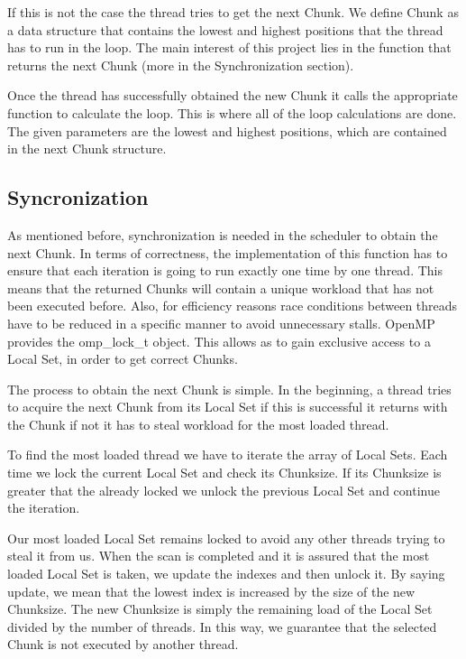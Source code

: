 \documentclass[12pt,a4paper]{article}
\begin{document}
If this is not the case the thread tries to get the next Chunk. We define Chunk as a data structure that contains the lowest and highest positions that the thread has to run in the loop. The main interest of this project lies in the function that returns the next Chunk (more in the Synchronization section).

Once the thread has successfully obtained the new Chunk it calls the appropriate function to calculate the loop. This is where all of the loop calculations are done. The given parameters are the lowest and highest positions, which are contained in the next Chunk structure.

\subsection{Syncronization}
As mentioned before, synchronization is needed in the scheduler to obtain the next Chunk. In terms of correctness, the implementation of this function has to ensure that each iteration is going to run exactly one time by one thread. This means that the returned Chunks will contain a unique workload that has not been executed before. Also, for efficiency reasons race conditions between threads have to be reduced in a specific manner to avoid unnecessary stalls. OpenMP provides the omp\_lock\_t object. This allows as to gain exclusive access to a Local Set, in order to get correct Chunks.

The process to obtain the next Chunk is simple. In the beginning, a thread tries to acquire the next Chunk from its Local Set if this is successful it returns with the Chunk if not it has to steal workload for the most loaded thread.

To find the most loaded thread we have to iterate the array of Local Sets. Each time we lock the current Local Set and check its Chunksize. If its Chunksize is greater that the already locked we unlock the previous Local Set and continue the iteration.

Our most loaded Local Set remains locked to avoid any other threads trying to steal it from us. When the scan is completed and it is assured that the most loaded Local Set is taken, we update the indexes and then unlock it. By saying update, we mean that the lowest index is increased by the size of the new Chunksize. The new Chunksize is simply the remaining load of the Local Set divided by the number of threads. In this way, we guarantee that the selected Chunk is not executed by another thread. 
\end{document}
